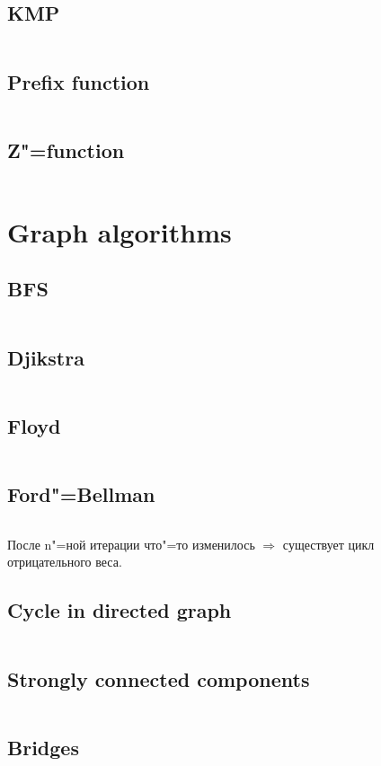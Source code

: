 ﻿\documentclass[10pt,twocolumn,oneside]{article}
\begin{document}
\subsection{KMP}
\inputminted[breaklines]{python}{String algorithms/kmp.py}
\subsection{Prefix function}
\inputminted[breaklines]{python}{String algorithms/prefix-function.py}
\subsection{Z"=function}
\inputminted[breaklines]{python}{String algorithms/z-function.py}

\section{Graph algorithms}
\subsection{BFS}
\inputminted[breaklines]{cpp}{Graph algorithms/bfs.cpp}
\subsection{Djikstra}
\inputminted[breaklines]{cpp}{Graph algorithms/djikstra.cpp}
\subsection{Floyd}
\inputminted[breaklines]{cpp}{Graph algorithms/floyd.cpp}
\subsection{Ford"=Bellman}
\inputminted[breaklines]{python}{Graph algorithms/ford-bellman.py}
После n"=ной итерации что"=то изменилось $\Rightarrow$ существует цикл отрицательного веса.
\subsection{Cycle in directed graph}
\inputminted[breaklines]{cpp}{Graph algorithms/cycle in directed graph.cpp}
\subsection{Strongly connected components}
\inputminted[breaklines]{cpp}{Graph algorithms/strongly connected components.cpp}
\subsection{Bridges}
\inputminted[breaklines]{cpp}{Graph algorithms/bridges.cpp}
\end{document}
